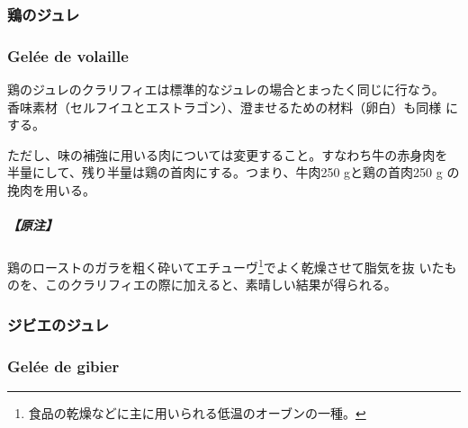 \begin{recette}
\maeaki

\hypertarget{ux9d8fux306eux30b8ux30e5ux30ec}{%
\subsubsection{鶏のジュレ}\label{ux9d8fux306eux30b8ux30e5ux30ec}}

\hypertarget{gelees-de-volaille}{%
\subsubsection{Gelée de volaille}\label{gelees-de-volaille}}


鶏のジュレのクラリフィエは標準的なジュレの場合とまったく同じに行なう。
香味素材（セルフイユとエストラゴン）、澄ませるための材料（卵白）も同様
にする。

ただし、味の補強に用いる肉については変更すること。すなわち牛の赤身肉を
半量にして、残り半量は鶏の首肉にする。つまり、牛肉250 gと鶏の首肉250 g
の挽肉を用いる。

\hypertarget{ux539fux6ce8-1}{%
\subparagraph{【原注】}\label{ux539fux6ce8-1}}

鶏のローストのガラを粗く砕いてエチューヴ\footnote{食品の乾燥などに主に用いられる低温のオーブンの一種。}でよく乾燥させて脂気を抜
いたものを、このクラリフィエの際に加えると、素晴しい結果が得られる。

\maeaki

\hypertarget{ux30b8ux30d3ux30a8ux306eux30b8ux30e5ux30ec}{%
\subsubsection{ジビエのジュレ}\label{ux30b8ux30d3ux30a8ux306eux30b8ux30e5ux30ec}}

\hypertarget{gelee-de-gibier}{%
\subsubsection{Gelée de gibier}\label{gelee-de-gibier}}



\end{recette}
